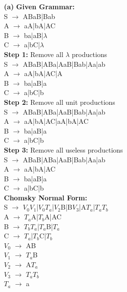 \documentclass{homework}
\begin{document}
\maketitle
\question
\textbf{(a)}
\textbf{Given Grammar:}\\
S $\rightarrow$ ABaB|Bab\\ 
A $\rightarrow$ aA|bA|AC\\
B $\rightarrow$ ba|aB|$\lambda$\\
C $\rightarrow$ a|bC|$\lambda$\\
\newline
\textbf{Step 1:} Remove all $\lambda$ productions\\
S $\rightarrow$ ABaB|ABa|AaB|Bab|Aa|ab\\ 
A $\rightarrow$ aA|bA|AC|A\\
B $\rightarrow$ ba|aB|a\\
C $\rightarrow$ a|bC|b\\
\newline
\textbf{Step 2:} Remove all unit productions\\
S $\rightarrow$ ABaB|ABa|AaB|Bab|Aa|ab\\ 
A $\rightarrow$ aA|bA|AC|aA|bA|AC\\
B $\rightarrow$ ba|aB|a\\
C $\rightarrow$ a|bC|b\\
\newline
\textbf{Step 3:} Remove all useless productions\\
S $\rightarrow$ ABaB|ABa|AaB|Bab|Aa|ab\\ 
A $\rightarrow$ aA|bA|AC\\
B $\rightarrow$ ba|aB|a\\
C $\rightarrow$ a|bC|b\\
\newline
\textbf{Chomsky Normal Form:}\\
S $\rightarrow$ $V_0V_1$|$V_0T_a$|$V_2$B|B$V_3$|A$T_a$|$T_aT_b$\\ 
A $\rightarrow$ $T_a$A|$T_b$A|AC\\
B $\rightarrow$ $T_bT_a$|$T_a$B|$T_a$\\
C $\rightarrow$ $T_a$|$T_b$C|$T_b$\\
$V_0$ $\rightarrow$ AB\\
$V_1$ $\rightarrow$ $T_a$B\\
$V_2$ $\rightarrow$ A$T_a$\\
$V_3$ $\rightarrow$ $T_aT_b$\\
$T_a$ $\rightarrow$ a\\
\end{document}
